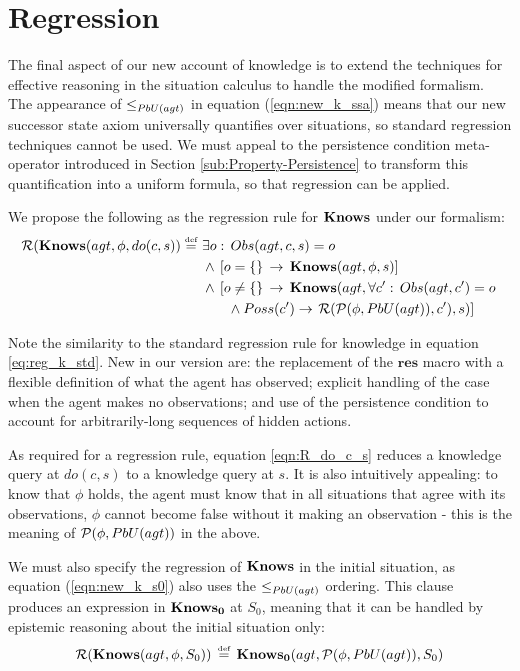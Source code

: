 \section{Regression}

The final aspect of our new account of knowledge is to extend the
techniques for effective reasoning in the situation calculus to handle
the modified formalism. The appearance of $\leq_{PbU(agt)}$ in equation
(\ref{eqn:new_k_ssa}) means that our new successor state axiom universally
quantifies over situations, so standard regression techniques cannot
be used. We must appeal to the persistence condition meta-operator
introduced in Section \ref{sub:Property-Persistence} to transform
this quantification into a uniform formula, so that regression can
be applied.

We propose the following as the regression rule for $\mathbf{Knows}$ under
our formalism:\begin{align}
\mathcal{R}(\mathbf{Knows}(agt,\phi,do(c,s))\stackrel{\mbox{\tiny def}}{=}\,\, & \exists o:\, Obs(agt,c,s)=o\nonumber \\
 & \wedge\,\left[o=\{\}\,\rightarrow\,\mathbf{Knows}(agt,\phi,s)\right]\nonumber \\
 & \wedge\,\left[o\neq\{\}\,\rightarrow\,\mathbf{Knows}(agt,\forall c':\, Obs(agt,c')=o\right.\nonumber \\
 & \,\,\,\,\,\,\,\,\,\,\,\wedge Poss(c')\rightarrow\left.\mathcal{R}(\mathcal{P}(\phi,PbU(agt)),c'),s)\right]\label{eqn:R_do_c_s}\end{align}


Note the similarity to the standard regression rule for knowledge
in equation \eqref{eq:reg_k_std}. New in our version are: the replacement
of the $\mathbf{res}$ macro with a flexible definition of what the
agent has observed; explicit handling of the case when the agent makes
no observations; and use of the persistence condition to account for
arbitrarily-long sequences of hidden actions.

As required for a regression rule, equation \eqref{eqn:R_do_c_s}
reduces a knowledge query at $do(c,s)$ to a knowledge query at $s$.
It is also intuitively appealing: to know that $\phi$ holds, the
agent must know that in all situations that agree with its observations,
$\phi$ cannot become false without it making an observation - this
is the meaning of $\mathcal{P}(\phi,PbU(agt))$ in the above.

We must also specify the regression of $\mathbf{Knows}$ in the initial situation,
as equation (\ref{eqn:new_k_s0}) also uses the $\leq_{PbU(agt)}$
ordering. This clause produces an expression in $\mathbf{Knows_{0}}$ at $S_{0}$,
meaning that it can be handled by epistemic reasoning about the initial
situation only:\begin{equation}
\mathcal{R}(\mathbf{Knows}(agt,\phi,S_{0}))\,\stackrel{\mbox{\tiny def}}{=}\,\mathbf{Knows_{0}}(agt,\mathcal{P}(\phi,PbU(agt)),S_{0})\label{eqn:R_s0}\end{equation}


